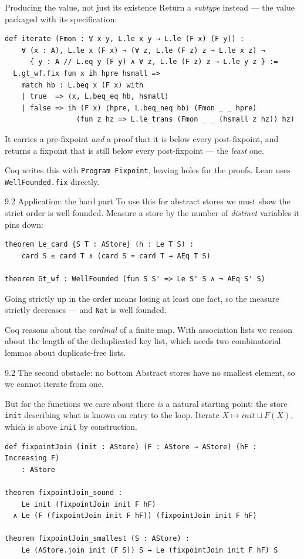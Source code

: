 \documentclass[aspectratio=169,10pt]{beamer}
\newcommand{\code}[1]{\texttt{\small #1}}
\begin{document}
\begin{frame}[fragile]{Producing the value, not just its existence}
Return a \emph{subtype} instead --- the value packaged with its
specification:
\begin{lstlisting}
def iterate (Fmon : ∀ x y, L.le x y → L.le (F x) (F y)) :
    ∀ (x : A), L.le x (F x) → (∀ z, L.le (F z) z → L.le x z) →
      { y : A // L.eq y (F y) ∧ ∀ z, L.le (F z) z → L.le y z } :=
  L.gt_wf.fix fun x ih hpre hsmall =>
    match hb : L.beq x (F x) with
    | true  => ⟨x, L.beq_eq hb, hsmall⟩
    | false => ih (F x) ⟨hpre, L.beq_neq hb⟩ (Fmon _ _ hpre)
                 (fun z hz => L.le_trans (Fmon _ _ (hsmall z hz)) hz)
\end{lstlisting}
It carries a pre-fixpoint \emph{and} a proof that it is below every
post-fixpoint, and returns a fixpoint that is still below every
post-fixpoint --- the \emph{least} one.
\medskip

Coq writes this with \code{Program Fixpoint}, leaving holes for the proofs.
Lean uses \code{WellFounded.fix} directly.
\end{frame}

\begin{frame}[fragile]{9.2 Application: the hard part}
To use this for abstract stores we must show the strict order is well
founded.  Measure a store by the number of \emph{distinct} variables it
pins down:
\begin{lstlisting}
theorem Le_card {S T : AStore} (h : Le T S) :
    card S ≤ card T ∧ (card S = card T → AEq T S)

theorem Gt_wf : WellFounded (fun S S' => Le S' S ∧ ¬ AEq S' S)
\end{lstlisting}
Going strictly up in the order means losing at least one fact, so the
measure strictly decreases --- and \code{Nat} is well founded.
\medskip

{\small Coq reasons about the \emph{cardinal} of a finite map.  With
association lists we reason about the length of the deduplicated key list,
which needs two combinatorial lemmas about duplicate-free lists.}
\end{frame}

\begin{frame}[fragile]{9.2 The second obstacle: no bottom}
Abstract stores have no smallest element, so we cannot iterate from one.
\medskip

But for the functions we care about there \emph{is} a natural starting point:
the store \code{init} describing what is known on entry to the loop.  Iterate
$X \mapsto \mathit{init} \sqcup F(X)$, which is above \code{init} by
construction.
\begin{lstlisting}
def fixpointJoin (init : AStore) (F : AStore → AStore) (hF : Increasing F)
    : AStore

theorem fixpointJoin_sound :
    Le init (fixpointJoin init F hF)
  ∧ Le (F (fixpointJoin init F hF)) (fixpointJoin init F hF)

theorem fixpointJoin_smallest (S : AStore) :
    Le (AStore.join init (F S)) S → Le (fixpointJoin init F hF) S
\end{lstlisting}
\end{frame}
\end{document}
